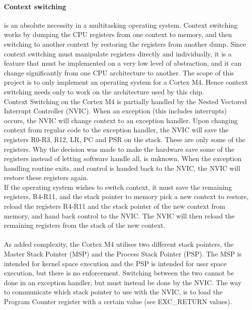 \paragraph{Context switching} is an absolute necessity in a multitasking operating system.
Context switching works by dumping the CPU registers from one context to memory,
and then switching to another context by restoring the registers from another dump.
Since context switching must manipulate registers directly and individually, it is a feature that must be implemented
on a very low level of abstraction, and it can change significantly from one CPU architecture to another.
The scope of this project is to only implement an operating system for a Cortex M4. Hence context switching needs only
to work on the architecture used by this chip.\\
Context Switching on the Cortex M4 is partially handled by the Nested Vectored Interrupt Controller (NVIC).
When an exception (this includes interrupts) occurs, the NVIC will change context to an exception handler.
Upon changing context from regular code to the exception handler, the NVIC will save the registers R0-R3, R12, LR, PC and PSR
on the stack. These are only some of the registers. Why the decision was made to make the hardware save some of the 
registers instead of letting software handle all, is unknown. 
When the exception handling routine exits, and control is handed back to the NVIC,
the NVIC will restore these registers again.\\
If the operating system wishes to switch context, it must save the remaining registers, R4-R11, and the stack pointer to memory 
pick a new context to restore, reload the registers R4-R11 and the stack pointer of the new context from memory,
and hand back control to the NVIC. The NVIC will then reload the remaining registers from the stack of the new context.\\\\
As added complexity, the Cortex M4 utilises two different stack pointers, the Master Stack Pointer (MSP) and the Process Stack Pointer (PSP).
The MSP is intended for kernel space execution and the PSP is intended for user space execution, but there is no enforcement.
Switching between the two cannot be done in an exception handler, but must instead be done by the NVIC.
The way to communicate which stack pointer to use with the NVIC, is to load the Program Counter register with a certain value (see EXC\_RETURN values). 



